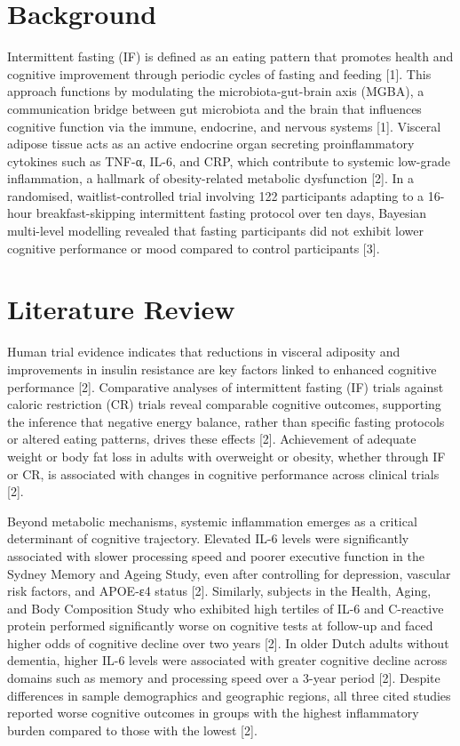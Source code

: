 \documentclass[conference]{IEEEtran}
\begin{document}
\section{Background}
Intermittent fasting (IF) is defined as an eating pattern that promotes health and cognitive improvement through periodic cycles of fasting and feeding [1]. This approach functions by modulating the microbiota-gut-brain axis (MGBA), a communication bridge between gut microbiota and the brain that influences cognitive function via the immune, endocrine, and nervous systems [1]. Visceral adipose tissue acts as an active endocrine organ secreting proinflammatory cytokines such as TNF-α, IL-6, and CRP, which contribute to systemic low-grade inflammation, a hallmark of obesity-related metabolic dysfunction [2]. In a randomised, waitlist-controlled trial involving 122 participants adapting to a 16-hour breakfast-skipping intermittent fasting protocol over ten days, Bayesian multi-level modelling revealed that fasting participants did not exhibit lower cognitive performance or mood compared to control participants [3].

\section{Literature Review}
Human trial evidence indicates that reductions in visceral adiposity and improvements in insulin resistance are key factors linked to enhanced cognitive performance [2]. Comparative analyses of intermittent fasting (IF) trials against caloric restriction (CR) trials reveal comparable cognitive outcomes, supporting the inference that negative energy balance, rather than specific fasting protocols or altered eating patterns, drives these effects [2]. Achievement of adequate weight or body fat loss in adults with overweight or obesity, whether through IF or CR, is associated with changes in cognitive performance across clinical trials [2].

Beyond metabolic mechanisms, systemic inflammation emerges as a critical determinant of cognitive trajectory. Elevated IL-6 levels were significantly associated with slower processing speed and poorer executive function in the Sydney Memory and Ageing Study, even after controlling for depression, vascular risk factors, and APOE-ε4 status [2]. Similarly, subjects in the Health, Aging, and Body Composition Study who exhibited high tertiles of IL-6 and C-reactive protein performed significantly worse on cognitive tests at follow-up and faced higher odds of cognitive decline over two years [2]. In older Dutch adults without dementia, higher IL-6 levels were associated with greater cognitive decline across domains such as memory and processing speed over a 3-year period [2]. Despite differences in sample demographics and geographic regions, all three cited studies reported worse cognitive outcomes in groups with the highest inflammatory burden compared to those with the lowest [2].
\end{document}
